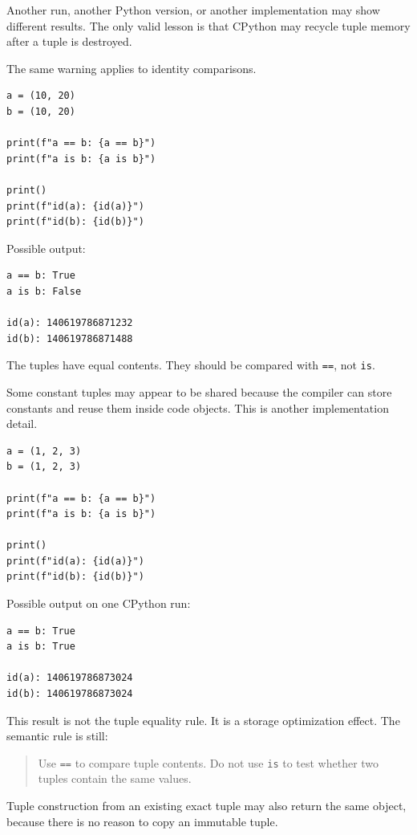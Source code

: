 Another run, another Python version, or another implementation may show different results. The only valid lesson is that CPython may recycle tuple memory after a tuple is destroyed.

The same warning applies to identity comparisons.

\begin{verbatim}
a = (10, 20)
b = (10, 20)

print(f"a == b: {a == b}")
print(f"a is b: {a is b}")

print()
print(f"id(a): {id(a)}")
print(f"id(b): {id(b)}")
\end{verbatim}

Possible output:

\begin{verbatim}
a == b: True
a is b: False

id(a): 140619786871232
id(b): 140619786871488
\end{verbatim}

The tuples have equal contents. They should be compared with \texttt{==}, not \texttt{is}.

Some constant tuples may appear to be shared because the compiler can store constants and reuse them inside code objects. This is another implementation detail.

\begin{verbatim}
a = (1, 2, 3)
b = (1, 2, 3)

print(f"a == b: {a == b}")
print(f"a is b: {a is b}")

print()
print(f"id(a): {id(a)}")
print(f"id(b): {id(b)}")
\end{verbatim}

Possible output on one CPython run:

\begin{verbatim}
a == b: True
a is b: True

id(a): 140619786873024
id(b): 140619786873024
\end{verbatim}

This result is not the tuple equality rule. It is a storage optimization effect. The semantic rule is still:

\begin{quote}
Use \texttt{==} to compare tuple contents. Do not use \texttt{is} to test whether two tuples contain the same values.
\end{quote}

Tuple construction from an existing exact tuple may also return the same object, because there is no reason to copy an immutable tuple.

